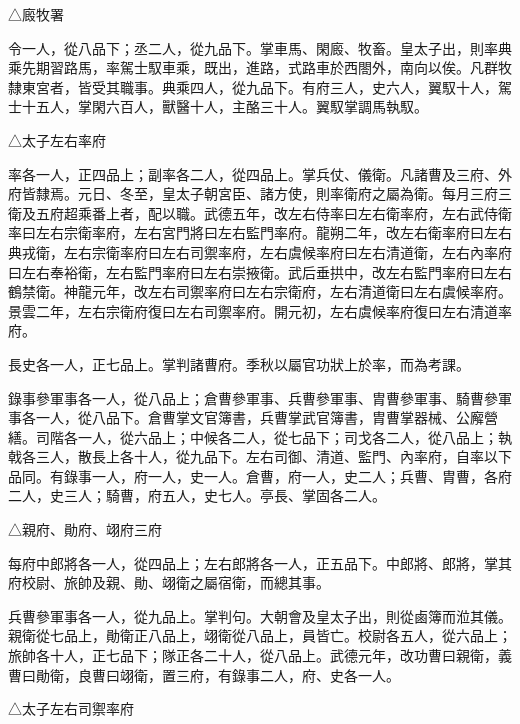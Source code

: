 \begin{pinyinscope}
 △廄牧署



 令一人，從八品下；丞二人，從九品下。掌車馬、閑廄、牧畜。皇太子出，則率典乘先期習路馬，率駕士馭車乘，既出，進路，式路車於西閤外，南向以俟。凡群牧隸東宮者，皆受其職事。典乘四人，從九品下。有府三人，史六人，翼馭十人，駕士十五人，掌閑六百人，獸醫十人，主酪三十人。翼馭掌調馬執馭。



 △太子左右率府



 率各一人，正四品上；副率各二人，從四品上。掌兵仗、儀衛。凡諸曹及三府、外府皆隸焉。元日、冬至，皇太子朝宮臣、諸方使，則率衛府之屬為衛。每月三府三衛及五府超乘番上者，配以職。武德五年，改左右侍率曰左右衛率府，左右武侍衛率曰左右宗衛率府，左右宮門將曰左右監門率府。龍朔二年，改左右衛率府曰左右典戎衛，左右宗衛率府曰左右司禦率府，左右虞候率府曰左右清道衛，左右內率府曰左右奉裕衛，左右監門率府曰左右崇掖衛。武后垂拱中，改左右監門率府曰左右鶴禁衛。神龍元年，改左右司禦率府曰左右宗衛府，左右清道衛曰左右虞候率府。景雲二年，左右宗衛府復曰左右司禦率府。開元初，左右虞候率府復曰左右清道率府。



 長史各一人，正七品上。掌判諸曹府。季秋以屬官功狀上於率，而為考課。



 錄事參軍事各一人，從八品上；倉曹參軍事、兵曹參軍事、胄曹參軍事、騎曹參軍事各一人，從八品下。倉曹掌文官簿書，兵曹掌武官簿書，胄曹掌器械、公廨營繕。司階各一人，從六品上；中候各二人，從七品下；司戈各二人，從八品上；執戟各三人，散長上各十人，從九品下。左右司御、清道、監門、內率府，自率以下品同。有錄事一人，府一人，史一人。倉曹，府一人，史二人；兵曹、胄曹，各府二人，史三人；騎曹，府五人，史七人。亭長、掌固各二人。



 △親府、勛府、翊府三府



 每府中郎將各一人，從四品上；左右郎將各一人，正五品下。中郎將、郎將，掌其府校尉、旅帥及親、勛、翊衛之屬宿衛，而總其事。



 兵曹參軍事各一人，從九品上。掌判句。大朝會及皇太子出，則從鹵簿而涖其儀。親衛從七品上，勛衛正八品上，翊衛從八品上，員皆亡。校尉各五人，從六品上；旅帥各十人，正七品下；隊正各二十人，從八品上。武德元年，改功曹曰親衛，義曹曰勛衛，良曹曰翊衛，置三府，有錄事二人，府、史各一人。



 △太子左右司禦率府




\end{pinyinscope}
